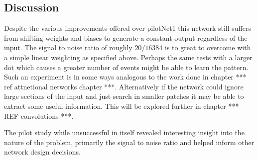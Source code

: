 \subsection{Discussion}
Despite the various improvements offered over pilotNet1 this network still suffers from shifting weights and biases to generate a constant output regardless of the input. 
The signal to noise ratio of roughly $20/16384$ is to great to overcome with a simple linear weighting as specified above.
Perhaps the same tests with a larger dot which causes a greater number of events might be able to learn the pattern. 
Such an experiment is in some ways analogous to the work done in chapter *** ref attnetional networks chapter ***. 
Alternatively if the network could ignore large sections of the input and just search in smaller patches it may be able to extract some useful information.
This will be explored further in chapter *** REF convolutions ***. 

The pilot study while unsuccessful in itself revealed interesting insight into the nature of the problem, primarily the signal to noise ratio and helped inform other network design decisions.
 




























